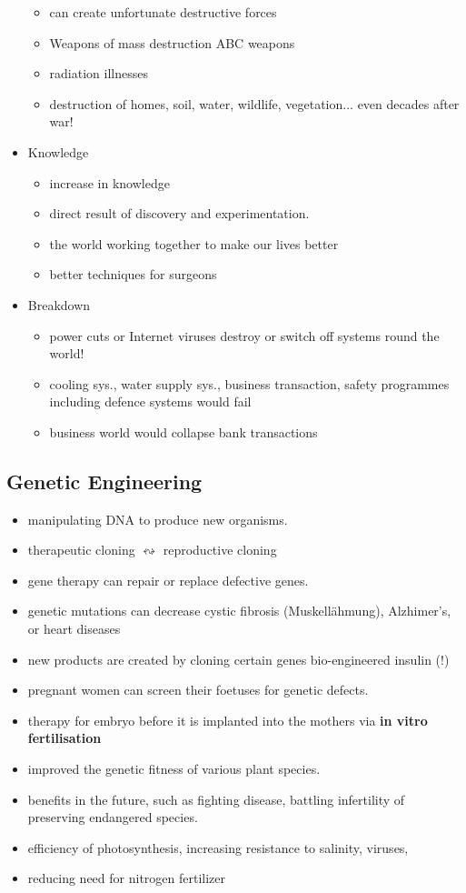 \documentclass[a5paper,12pt,twoside,titlepage]{scrartcl}
\begin{document}
\begin{itemize}
\begin{itemize}
			\item can create unfortunate destructive forces
			\item Weapons of mass destruction \textrightarrow ABC weapons
			\item \textrightarrow radiation illnesses 
			\item \textrightarrow destruction of homes, soil, water, wildlife, vegetation... even decades after war!
		\end{itemize}
	\item Knowledge
		\begin{itemize}
			\item increase in knowledge
			\item direct result of discovery and experimentation. 
			\item the world working together to make our lives better
			\item better techniques for surgeons
		\end{itemize}
	\item Breakdown
		\begin{itemize}
			\item power cuts or Internet viruses destroy or switch off systems round the world!
			\item cooling sys., water supply sys., business transaction, safety programmes including defence systems would fail
			\item business world would collapse \textrightarrow bank transactions
		\end{itemize}
\end{itemize}

		\subsection{Genetic Engineering}
		\begin{itemize}
			\item manipulating DNA to produce new organisms.
			\item therapeutic cloning $ \leftrightsquigarrow $ reproductive cloning
			\item gene therapy can repair or replace defective genes. 
			\item genetic mutations can decrease cystic fibrosis (Muskellähmung), Alzhimer's, or heart diseases
			\item new products are created by cloning certain genes \textrightarrow bio-engineered insulin (!)
			\item pregnant women can screen their foetuses for genetic defects. 
			\item therapy for embryo before it is implanted into the mothers via \textbf{in vitro fertilisation}	
			\item improved the genetic fitness of various plant species. 
			\item benefits in the future, such as fighting disease, battling infertility of preserving endangered species. 
			\item efficiency of photosynthesis, increasing resistance to salinity, viruses, 
			\item reducing need for nitrogen fertilizer
		\end{itemize}
\end{document}
